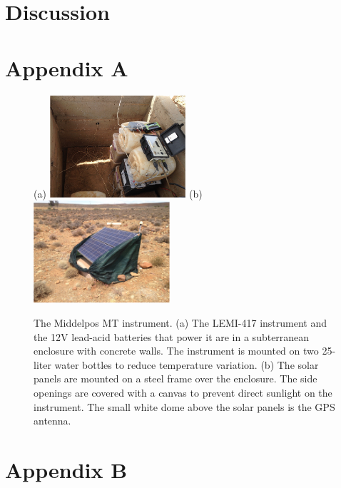 \documentclass[draft,linenumbers]{agujournal2018}
\begin{document}
\clearpage

\section{Discussion}

\section{Appendix A}

\begin{figure}[h]
  \centering
  (a)
  \includegraphics[width=0.45\textwidth]{figures/instrument.pdf}
  (b)
  \includegraphics[width=0.45\textwidth]{figures/solarpanel.pdf}
  \caption{The Middelpos MT instrument. (a) The LEMI-417 instrument and the 12V lead-acid batteries that power it are in a subterranean enclosure with concrete walls. The instrument is mounted on two 25-liter water bottles to reduce temperature variation. (b) The solar panels are mounted on a steel frame over the enclosure. The side openings are covered with a canvas to prevent direct sunlight on the instrument. The small white dome above the solar panels is the GPS antenna.}
  \label{fig:lemi}
\end{figure}

\section{Appendix B}
\end{document}
